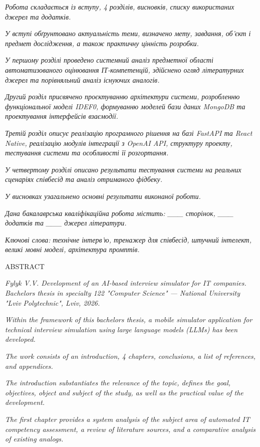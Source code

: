\emph{Робота складається із вступу, 4 розділів, висновків, списку
використаних джерел та додатків.}

\emph{У вступі обґрунтовано актуальність теми, визначено мету, завдання,
об'єкт і предмет дослідження, а також практичну цінність розробки.}

\emph{У першому розділі проведено системний аналіз предметної області
автоматизованого оцінювання ІТ-компетенцій, здійснено огляд літературних
джерел та порівняльний аналіз існуючих аналогів.}

\emph{Другий розділ присвячено проєктуванню архітектури системи,
розробленню функціональної моделі IDEF0, формуванню моделей бази даних
MongoDB та проектування інтерфейсів взаємодії.}

\emph{Третій розділ описує реалізацію програмного рішення на базі
FastAPI та React Native, реалізацію модулів інтеграції з OpenAI API,
структуру проекту, тестування системи та особливості її розгортання.}

\emph{У четвертому розділі описано результати тестування системи на
реальних сценаріях співбесід та аналіз отриманого фідбеку.}

\emph{У висновках узагальнено основні результати виконаної роботи.}

\emph{Дана бакалаврська кваліфікаційна робота містить: \_\_\_ сторінок,
\_\_\_ додатків та \_\_\_ джерел літератури.}

\emph{Ключові слова:} \emph{технічне інтерв'ю, тренажер для співбесід,
штучний інтелект, великі мовні моделі, архітектура промптів.}

ABSTRACT

\emph{Fylyk V.V. Development of an AI-based interview simulator for IT
companies. Bachelor\textquotesingle s thesis in specialty 122 "Computer
Science" --- National University "Lviv Polytechnic", Lviv, 2026.}

\emph{Within the framework of this bachelor\textquotesingle s thesis, a
mobile simulator application for technical interview simulation using
large language models (LLMs) has been developed.}

\emph{The work consists of an introduction, 4 chapters, conclusions, a
list of references, and appendices.}

\emph{The introduction substantiates the relevance of the topic, defines
the goal, objectives, object and subject of the study, as well as the
practical value of the development.}

\emph{The first chapter provides a system analysis of the subject area
of automated IT competency assessment, a review of literature sources,
and a comparative analysis of existing analogs.}

